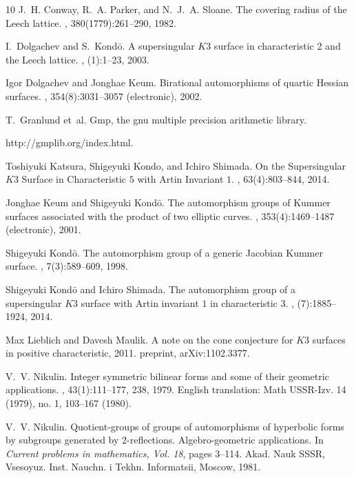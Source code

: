 \documentclass{amsart}
\theoremstyle{plain}
\theoremstyle{definition}
\theoremstyle{remark}
\numberwithin{equation}{section}
\numberwithin{table}{section}
\numberwithin{figure}{section}
\begin{document}
\begin{thebibliography}{10}
J.~H. Conway, R.~A. Parker, and N.~J.~A. Sloane.
\newblock The covering radius of the {L}eech lattice.
, 380(1779):261--290, 1982.

I.~Dolgachev and S.~Kond{\=o}.
\newblock A supersingular {$K3$} surface in characteristic 2 and the {L}eech
  lattice.
, (1):1--23, 2003.

Igor Dolgachev and Jonghae Keum.
\newblock Birational automorphisms of quartic {H}essian surfaces.
, 354(8):3031--3057 (electronic), 2002.

T.~Granlund et~al.
\newblock Gmp, the gnu multiple precision arithmetic library. 

\newblock http://gmplib.org/index.html.

Toshiyuki Katsura, Shigeyuki Kondo, and Ichiro Shimada.
\newblock On the {S}upersingular {$K3$} {S}urface in {C}haracteristic {$5$}
  with {A}rtin {I}nvariant {$1$}.
, 63(4):803--844, 2014.

Jonghae Keum and Shigeyuki Kond{\=o}.
\newblock The automorphism groups of {K}ummer surfaces associated with the
  product of two elliptic curves.
, 353(4):1469--1487 (electronic), 2001.

Shigeyuki Kond{\=o}.
\newblock The automorphism group of a generic {J}acobian {K}ummer surface.
, 7(3):589--609, 1998.

Shigeyuki Kond{\=o} and Ichiro Shimada.
\newblock The automorphism group of a supersingular {$K3$} surface with {A}rtin
  invariant $1$ in characteristic $3$. 
   , (7):1885--1924, 2014.

Max Lieblich and Davesh Maulik.
\newblock A note on the cone conjecture for {$K3$} surfaces in positive
  characteristic, 2011.
\newblock preprint, arXiv:1102.3377.


V.~V. Nikulin.
\newblock Integer symmetric bilinear forms and some of their geometric
  applications.
, 43(1):111--177, 238, 1979.
\newblock English translation: Math USSR-Izv. 14 (1979), no. 1, 103--167
  (1980).

V.~V. Nikulin.
\newblock Quotient-groups of groups of automorphisms of hyperbolic forms by
  subgroups generated by {$2$}-reflections. {A}lgebro-geometric applications.
\newblock In {\em Current problems in mathematics, Vol. 18}, pages 3--114.
  Akad. Nauk SSSR, Vsesoyuz. Inst. Nauchn. i Tekhn. Informatsii, Moscow, 1981.


\end{thebibliography}
\end{document}
